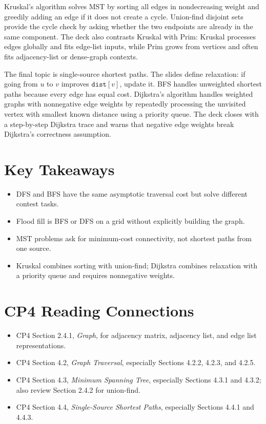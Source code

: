 \documentclass[11pt]{article}
\begin{document}
Kruskal's algorithm solves MST by sorting all edges in nondecreasing weight and greedily adding an edge if it does not create a cycle. Union-find disjoint sets provide the cycle check by asking whether the two endpoints are already in the same component. The deck also contrasts Kruskal with Prim: Kruskal processes edges globally and fits edge-list inputs, while Prim grows from vertices and often fits adjacency-list or dense-graph contexts.

The final topic is single-source shortest paths. The slides define relaxation: if going from \(u\) to \(v\) improves \(\texttt{dist}[v]\), update it. BFS handles unweighted shortest paths because every edge has equal cost. Dijkstra's algorithm handles weighted graphs with nonnegative edge weights by repeatedly processing the unvisited vertex with smallest known distance using a priority queue. The deck closes with a step-by-step Dijkstra trace and warns that negative edge weights break Dijkstra's correctness assumption.

\section*{Key Takeaways}
\begin{itemize}
  \item DFS and BFS have the same asymptotic traversal cost but solve different contest tasks.
  \item Flood fill is BFS or DFS on a grid without explicitly building the graph.
  \item MST problems ask for minimum-cost connectivity, not shortest paths from one source.
  \item Kruskal combines sorting with union-find; Dijkstra combines relaxation with a priority queue and requires nonnegative weights.
\end{itemize}

\section*{CP4 Reading Connections}
\begin{itemize}
  \item CP4 Section 2.4.1, \textit{Graph}, for adjacency matrix, adjacency list, and edge list representations.
  \item CP4 Section 4.2, \textit{Graph Traversal}, especially Sections 4.2.2, 4.2.3, and 4.2.5.
  \item CP4 Section 4.3, \textit{Minimum Spanning Tree}, especially Sections 4.3.1 and 4.3.2; also review Section 2.4.2 for union-find.
  \item CP4 Section 4.4, \textit{Single-Source Shortest Paths}, especially Sections 4.4.1 and 4.4.3.
\end{itemize}
\end{document}

